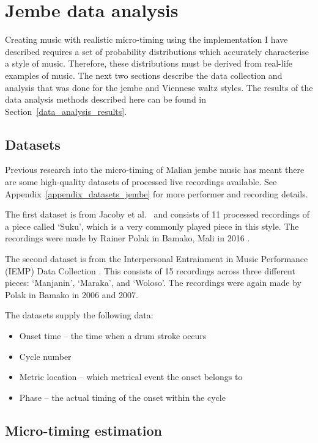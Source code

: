 \documentclass[12pt,twoside,openright]{report}
\begin{document}
\section{Jembe data analysis} \label{jembe_data_analysis}

Creating music with realistic micro-timing using the implementation I have
described requires a set of probability distributions which accurately
characterise a style of music. Therefore, these distributions must be derived
from real-life examples of music. The next two sections describe the data
collection and analysis that was done for the jembe and Viennese waltz styles.
The results of the data analysis methods described here can be found in
Section~\ref{data_analysis_results}.


\subsection{Datasets} \label{jembe_datasets}

Previous research into the micro-timing of Malian jembe music has meant there
are some high-quality datasets of processed live recordings available. See Appendix~\ref{appendix_datasets_jembe} for more performer and recording details.

The first dataset is from Jacoby et al.\ \cite{jacoby2021} and consists of 11
processed recordings of a piece called `Suku', which is a very commonly played
piece in this style. The recordings were made by Rainer Polak in Bamako, Mali in
2016 \cite{jacoby2021supp}.

The second dataset is from the Interpersonal Entrainment in Music Performance
(IEMP) Data Collection \cite{polak2020,clayton2021}. This consists of 15 recordings
across three different pieces: `Manjanin', `Maraka', and `Woloso'. The
recordings were again made by Polak in Bamako in 2006 and 2007.

The datasets supply the following data:
\begin{itemize}
	\item Onset time -- the time when a drum stroke occurs
	\item Cycle number
	\item Metric location -- which metrical event the onset belongs to
	\item Phase -- the actual timing of the onset within the cycle
\end{itemize}


\subsection{Micro-timing estimation} \label{jembe_micro-timing}
\end{document}
